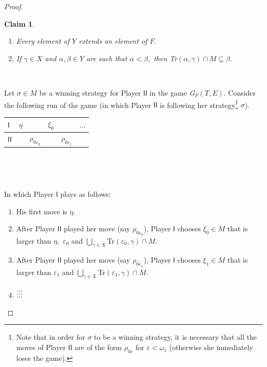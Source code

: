 \documentclass[10pt,a4paper]{amsart}
\newtheorem{claim}{Claim}
\begin{document}
\begin{proof}
\begin{claim}
\begin{enumerate}
\item Every element of $Y$ extends an element of $F.$

\item If $\gamma\in X$ and $\alpha,\beta\in Y$ are such that $\alpha<\beta,$
then \textsf{Tr}$(\alpha,\gamma)\cap M\subseteq\beta.$
\end{enumerate}
\end{claim}

\qquad\ \ \ \ \ 

Let $\sigma\in M$ be a winning strategy for Player $\mathsf{II}$ in the game
\emph{G}$_{F}\left(  T,E\right)  .$ Consider the following run of the game (in
which Player $\mathsf{II}$ is following her strategy\footnote{Note that in
order for $\sigma$ to be a winning strategy, it is necessary that all the
moves of Player $\mathsf{II}$ are of the form $\rho_{0\varepsilon}$ for
$\varepsilon<\omega_{1}$ (otherwise she inmediately loses the game).} $\sigma
$).\newline

\hfill%
\begin{tabular}
[c]{|l|l|l|l|l|l|}\hline
$\mathsf{I}$ & $\eta$ &  & $\xi_{0}$ &  & $...$\\\hline
$\mathsf{II}$ &  & $\rho_{0\varepsilon_{0}}$ &  & $\rho_{0\varepsilon_{1}}$ &
\\\hline
\end{tabular}
\hfill\ 

\qquad\ \qquad\ \ 

In which Player $\mathsf{I}$ plays as follows:

\begin{enumerate}
\item His first move is $\eta.$

\item After Player $\mathsf{II}$ played her move (say $\rho_{0\varepsilon_{0}%
}$), Player $\mathsf{I}$ chooses $\xi_{0}\in M$ that is larger than $\eta,$
$\varepsilon_{0}$ and $\bigcup\limits_{\gamma\in X}$\textsf{Tr}$(\varepsilon
_{0},\gamma)\cap M.$

\item After Player $\mathsf{II}$ played her move (say $\rho_{0\varepsilon_{1}%
}$), Player $\mathsf{I}$ chooses $\xi_{1}\in M$ that is larger than
$\varepsilon_{1}$ and $\bigcup\limits_{\gamma\in X}$\textsf{Tr}$(\varepsilon
_{1},\gamma)\cap M.$

\item[$\vdots$] $\vdots\hfill\vdots\hfill\vdots$
\end{enumerate}


\end{proof}
\end{document}
